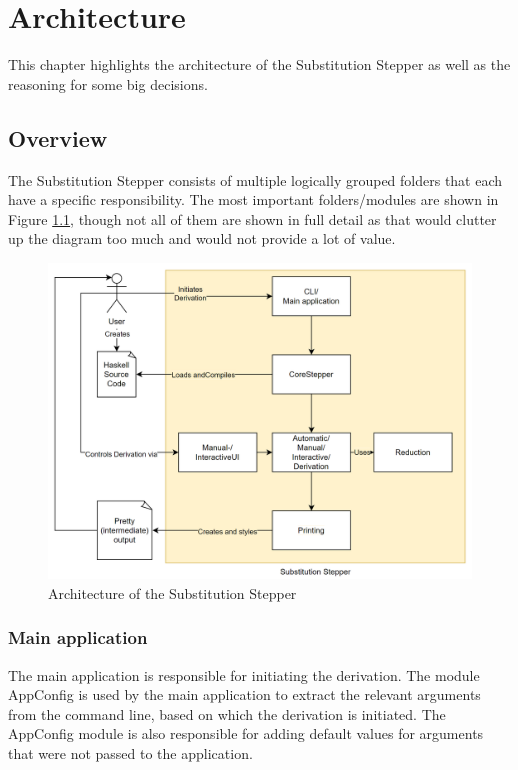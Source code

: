 \chapter{Architecture}
This chapter highlights the architecture of the Substitution Stepper as well as the reasoning for some big decisions.

\section{Overview}
The Substitution Stepper consists of multiple logically grouped folders that each have a specific responsibility.
The most important folders/modules are shown in Figure \ref*{fig:architecture},
though not all of them are shown in full detail as that would clutter up the diagram too much and would not provide a lot of value.

\begin{figure}[ht!]
    \includegraphics[width=1\textwidth]{resources/Architecture.PNG}
    \caption{Architecture of the Substitution Stepper}
    \label{fig:architecture}
\end{figure}

\subsection{Main application}
The main application is responsible for initiating the derivation.
The module AppConfig is used by the main application to extract the relevant arguments from the command line,
based on which the derivation is initiated.
The AppConfig module is also responsible for adding default values for arguments that were not passed to the application.

